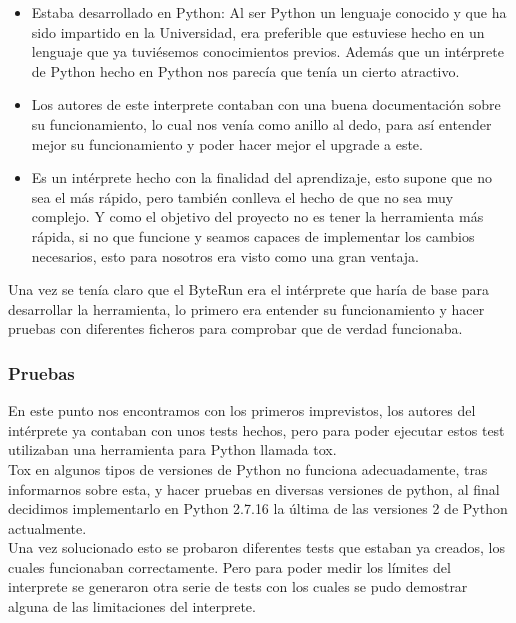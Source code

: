\begin{itemize}
	\item Estaba desarrollado en Python: Al ser Python un lenguaje conocido y que ha sido impartido en la Universidad, era preferible que estuviese hecho en un lenguaje que ya tuviésemos conocimientos previos. Además que un intérprete de Python hecho en Python nos parecía que tenía un cierto atractivo.
	\item Los autores de este interprete contaban con una buena documentación sobre su funcionamiento, lo cual nos venía como anillo al dedo, para así entender mejor su funcionamiento y poder hacer mejor el upgrade a este.
	\item Es un intérprete hecho con la finalidad del aprendizaje, esto supone que no sea el más rápido, pero también conlleva el hecho de que no sea muy complejo. Y como el objetivo del proyecto no es tener la herramienta más rápida, si no que funcione y seamos capaces de implementar los cambios necesarios, esto para nosotros era visto como una gran ventaja.
\end{itemize}

	
Una vez se tenía claro que el ByteRun era el intérprete que haría de base para desarrollar la herramienta, lo primero era entender su funcionamiento y hacer pruebas con diferentes ficheros para comprobar que de verdad funcionaba.\\

\subsubsection{Pruebas}

En este punto nos encontramos con los primeros imprevistos, los autores del intérprete ya contaban con unos tests hechos, pero para poder ejecutar estos test utilizaban una herramienta para Python llamada tox.\\ 

Tox en algunos tipos de versiones de Python no funciona adecuadamente, tras informarnos sobre esta, y hacer pruebas en diversas versiones de python, al final decidimos implementarlo en Python 2.7.16 la última de las versiones 2 de Python actualmente.\\

Una vez solucionado esto se probaron diferentes tests que estaban ya creados, los cuales funcionaban correctamente. Pero para poder medir los límites del interprete se generaron otra serie de tests con los cuales se pudo demostrar alguna de las limitaciones del interprete.\\


